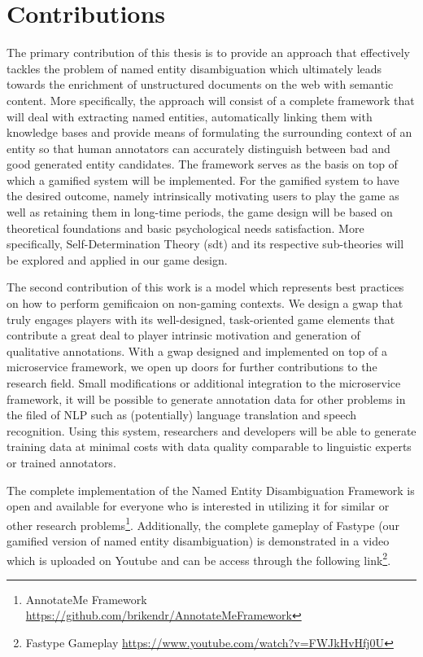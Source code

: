 \section{Contributions}
The primary contribution of this thesis is to provide an approach that effectively tackles the problem of named entity disambiguation which ultimately leads towards the enrichment of unstructured documents on the web with semantic content. More specifically, the approach will consist of a complete framework that will deal with extracting named entities, automatically linking them with knowledge bases and provide means of formulating the surrounding context of an entity so that human annotators can accurately distinguish between bad and good generated entity candidates. The framework serves as the basis on top of which a gamified system will be implemented. For the gamified system to have the desired outcome, namely intrinsically motivating users to play the game as well as retaining them in long-time periods, the game design will be based on theoretical foundations and basic psychological needs satisfaction. More specifically, Self-Determination Theory (\ac{sdt}) and its respective sub-theories will be explored and applied in our game design.

The second contribution of this work is a model which represents best practices on how to perform gemificaion on non-gaming contexts. We design a \ac{gwap} that truly engages players with its well-designed, task-oriented game elements that contribute a great deal to player intrinsic motivation and generation of qualitative annotations. With a \ac{gwap} designed and implemented on top of a microservice framework, we open up doors for further contributions to the research field. Small modifications or additional integration to the microservice framework, it will be possible to generate annotation data for other problems in the filed of NLP such as (potentially) language translation and speech recognition. Using this system, researchers and developers will be able to generate training data at minimal costs with data quality comparable to linguistic experts or trained annotators.

The complete implementation of the Named Entity Disambiguation Framework is open and available for everyone who is interested in utilizing it for similar or other research problems\footnote{AnnotateMe Framework \url{https://github.com/brikendr/AnnotateMeFramework}}. Additionally, the complete gameplay of Fastype (our gamified version of named entity disambiguation) is demonstrated in a video which is uploaded on Youtube and can be access through the following link\footnote{Fastype Gameplay \url{https://www.youtube.com/watch?v=FWJkHvHfj0U}}.